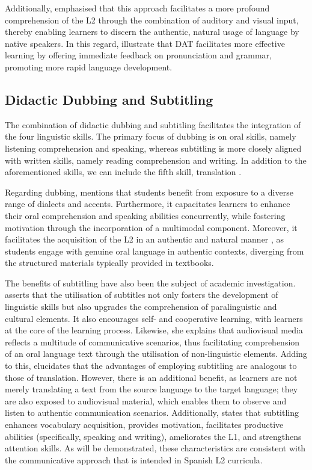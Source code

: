 Additionally, \textcite{chaume2018audiovisual} emphasised that this approach facilitates a
more profound comprehension of the L2 through the combination of
auditory and visual input, thereby enabling learners to discern the
authentic, natural usage of language by native speakers. In this regard,
\textcite{gonzalez-vera2016audiovisual} illustrate that DAT facilitates more
effective learning by offering immediate feedback on pronunciation and
grammar, promoting more rapid language development.

\subsection{Didactic Dubbing and Subtitling}\label{sub-sec-didacticdubbing}

The combination of didactic dubbing and subtitling facilitates the
integration of the four linguistic skills. The primary focus of dubbing
is on oral skills, namely listening comprehension and speaking, whereas
subtitling is more closely aligned with written skills, namely reading
comprehension and writing. In addition to the aforementioned skills, we
can include the fifth skill, translation \cite{Carreres03072017}.

Regarding dubbing, \textcite{diaz-cintas2012subtitulos} mentions that students benefit
from exposure to a diverse range of dialects and accents. Furthermore,
it capacitates learners to enhance their oral comprehension and speaking
abilities concurrently, while fostering motivation through the
incorporation of a multimodal component. Moreover, it facilitates the
acquisition of the L2 in an authentic and natural manner
\cite{fernandez-costales2023tradilex}, as students engage with
genuine oral language in authentic contexts, diverging from the
structured materials typically provided in textbooks.

The benefits of subtitling have also been the subject of academic
investigation. \textcite{ÁlvarezSánchez_2017} asserts that the utilisation of
subtitles not only fosters the development of linguistic skills but also
upgrades the comprehension of paralinguistic and cultural elements. It
also encourages self- and cooperative learning, with learners at the
core of the learning process. Likewise, she explains that audiovisual
media reflects a multitude of communicative scenarios, thus facilitating
comprehension of an oral language text through the utilisation of
non-linguistic elements. Adding to this, \textcite{lertola2018translation} elucidates that
the advantages of employing subtitling are analogous to those of
translation. However, there is an additional benefit, as learners are
not merely translating a text from the source language to the target
language; they are also exposed to audiovisual material, which enables
them to observe and listen to authentic communication scenarios.
Additionally, \textcite{soler2020} states that subtitling enhances
vocabulary acquisition, provides motivation, facilitates productive
abilities (specifically, speaking and writing), ameliorates the L1, and
strengthens attention skills. As will be demonstrated, these
characteristics are consistent with the communicative approach that is
intended in Spanish L2 curricula.

